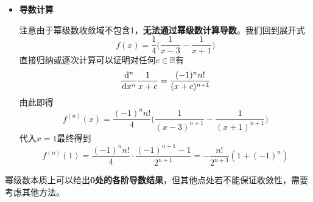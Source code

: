\documentclass[a4paper,UTF8,fontset=windows,AutoFakeBold]{ctexart}
\newcommand*{\dr}{\hspace{0.07em}\mathrm{d}}
\newcommand*{\rb}{\mathbb{R}}
\newcommand*{\note}{\noindent *}
\theoremstyle{ex}
\begin{document}
\begin{framed}
{\begin{itemize}
        通过上述讨论，我们最终得到原幂级数的收敛域为$(-1,1)$。

        \item \textbf{导数计算}
        
        注意由于幂级数收敛域不包含1，\textbf{无法通过幂级数计算导数}。我们回到展开式
        $$f(x)=\frac{1}{4}\bigg(\frac{1}{x-3}-\frac{1}{x+1}\bigg)$$
        直接归纳或逐次计算可以证明对任何$c\in\rb$有
        $$\frac{\dr^n}{\dr x^n}\frac{1}{x+c}=\frac{(-1)^nn!}{(x+c)^{n+1}}$$
        由此即得
        $$f^{(n)}(x)=\frac{(-1)^nn!}{4}\bigg(\frac{1}{(x-3)^{n+1}}-\frac{1}{(x+1)^{n+1}}\bigg)$$
        代入$x=1$最终得到
        $$f^{(n)}(1)=\frac{(-1)^nn!}{4}\cdot\frac{(-1)^{n+1}-1}{2^{n+1}}=-\frac{n!}{2^{n+3}}(1+(-1)^n)$$
    \end{itemize}
}
\end{framed}

\note 幂级数本质上可以给出\textbf{0处的各阶导数结果}，但其他点处若不能保证收敛性，需要考虑其他方法。
\end{document}
